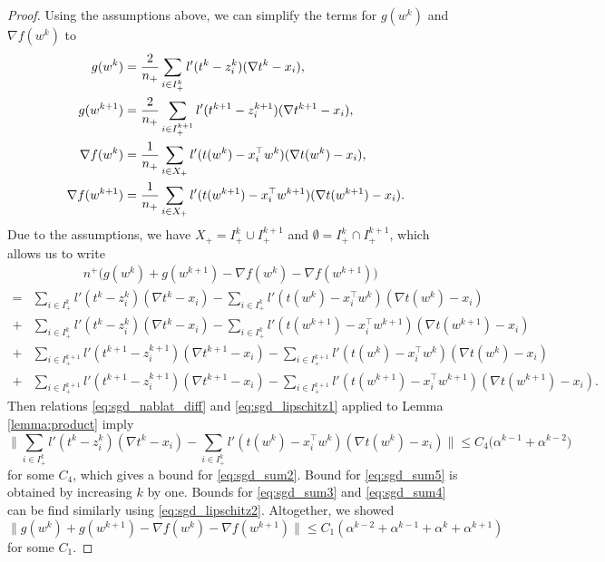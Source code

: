\documentclass[]{interact}
\theoremstyle{plain}%
\theoremstyle{definition}
\theoremstyle{remark}
\newcommand{\norm}[1]{\|#1\|}
\begin{document}
\begin{proof}
Using the assumptions above, we can simplify the terms for $g(w^k)$ and $\nabla f(w^k)$ to
$$
\aligned
g(w^k) &= \frac{2}{n_+}\sum_{i\in I_+^k}l'(t^k-z_i^k)(\nabla t^k - x_i), \\
g(w^{k+1}) &= \frac{2}{n_+}\sum_{i\in I_+^{k+1}}l'(t^{k+1}-z_i^{k+1})(\nabla t^{k+1} - x_i), \\
\nabla f(w^k) &= \frac1{n_+}\sum_{i\in X_+}l'(t(w^k)-x_i^\top w^k)(\nabla t(w^k) - x_i), \\
\nabla f(w^{k+1}) &= \frac1{n_+}\sum_{i\in X_+}l'(t(w^{k+1})-x_i^\top w^{k+1})(\nabla t(w^{k+1}) - x_i).
\endaligned
$$
Due to the assumptions, we have $X_+=I_+^k\cup I_+^{k+1}$ and $\emptyset=I_+^k\cap I_+^{k+1}$, which allows us to write
\begin{subequations}\label{eq:sgd_sum}
\begin{align}
\label{eq:sgd_sum1} &\qquad\qquad n^+\Big(g(w^k)+g(w^{k+1})-\nabla f(w^k)-\nabla f(w^{k+1})\Big)\\
\label{eq:sgd_sum2} =&\sum_{i\in I_+^k}l'(t^k-z_i^k)(\nabla t^k - x_i) - \sum_{i\in I_+^k}l'(t(w^k)-x_i^\top w^k)(\nabla t(w^k) - x_i) \\
\label{eq:sgd_sum3} +&\sum_{i\in I_+^k}l'(t^k-z_i^k)(\nabla t^k - x_i) - \sum_{i\in I_+^k}l'(t(w^{k+1})-x_i^\top w^{k+1})(\nabla t(w^{k+1}) - x_i)\\
\label{eq:sgd_sum4} +&\sum_{i\in I_+^{k+1}}l'(t^{k+1}-z_i^{k+1})(\nabla t^{k+1} - x_i) - \sum_{i\in I^{k+1}_+}l'(t(w^k)-x_i^\top w^k)(\nabla t(w^k) - x_i) \\
\label{eq:sgd_sum5} +&\sum_{i\in I_+^{k+1}}l'(t^{k+1}-z_i^{k+1})(\nabla t^{k+1} - x_i)  - \sum_{i\in I_+^{k+1}}l'(t(w^{k+1})-x_i^\top w^{k+1})(\nabla t(w^{k+1}) - x_i).
\end{align}
\end{subequations}
Then relations \eqref{eq:sgd_nablat_diff} and \eqref{eq:sgd_lipschitz1} applied to Lemma \ref{lemma:product} imply
$$
\Big\| \sum_{i\in I_+^k}l'(t^k-z_i^k)(\nabla t^k - x_i) - \sum_{i\in I_+^k}l'(t(w^k)-x_i^\top w^k)(\nabla t(w^k) - x_i)\Big\| \le C_4\big(\alpha^{k-1} + \alpha^{k-2})
$$
for some $C_4$, which gives a bound for \eqref{eq:sgd_sum2}. Bound for \eqref{eq:sgd_sum5} is obtained by increasing $k$ by one. Bounds for \eqref{eq:sgd_sum3} and \eqref{eq:sgd_sum4} can be find similarly using \eqref{eq:sgd_lipschitz2}. Altogether, we showed
\begin{equation}\label{eq:nec_cond3}
\norm{g(w^k)+g(w^{k+1})-\nabla f(w^k)-\nabla f(w^{k+1})} \le C_1(\alpha^{k-2} + \alpha^{k-1} + \alpha^{k} + \alpha^{k+1})
\end{equation}
for some $C_1$.


\end{proof}
\end{document}
